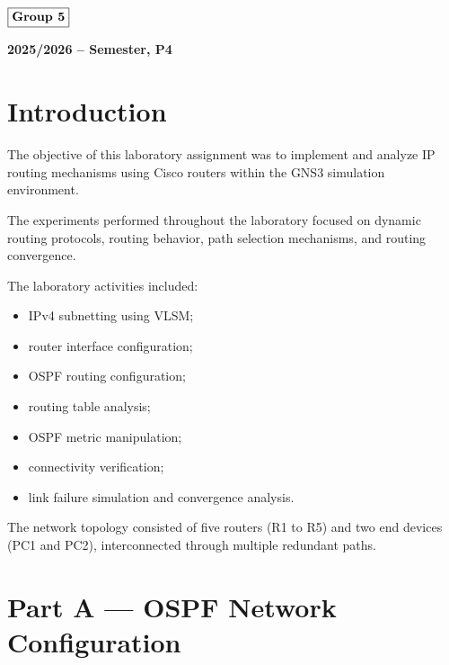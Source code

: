 \documentclass[12pt]{article}
\begin{document}
\begin{flushleft}
\large $\boxed{\text{\bf Group 5}}$\\[4.0cm]
\end{flushleft}

\begin{center}
\large \bf 2025/2026 --  Semester, P4
\end{center}

\thispagestyle{empty}

\setcounter{page}{0}

\tableofcontents

\newpage

\section{Introduction}

The objective of this laboratory assignment was to implement and analyze IP routing mechanisms using Cisco routers within the GNS3 simulation environment.

The experiments performed throughout the laboratory focused on dynamic routing protocols, routing behavior, path selection mechanisms, and routing convergence.

The laboratory activities included:
\begin{itemize}
    \item IPv4 subnetting using VLSM;
    \item router interface configuration;
    \item OSPF routing configuration;
    \item routing table analysis;
    \item OSPF metric manipulation;
    \item connectivity verification;
    \item link failure simulation and convergence analysis.
\end{itemize}

The network topology consisted of five routers (R1 to R5) and two end devices (PC1 and PC2), interconnected through multiple redundant paths.

\newpage

\section{Part A — OSPF Network Configuration}
\end{document}
